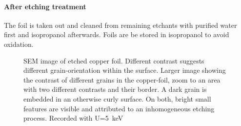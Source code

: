 	\paragraph{After etching treatment}
	The foil is taken out and cleaned from remaining etchants with purified water first and isopropanol afterwards. Foils are be stored in isopropanol to avoid oxidation.
	
%	
	
	\begin{figure}\centering
		 \quad
		 \quad
		\caption{SEM image of etched copper foil. Different contrast suggests different grain-orientation within the surface.  Larger image showing the contrast of different grains in the copper-foil,  zoom to an area with two different contrasts and their border.  A dark grain is embedded in an otherwise curly surface. On both, bright small features are visible and attributed to an inhomogeneous etching process. Recorded with U=\SI{5}{\kilo \eV}}
		\label{fig:SEM-gb}
	\end{figure}
	
